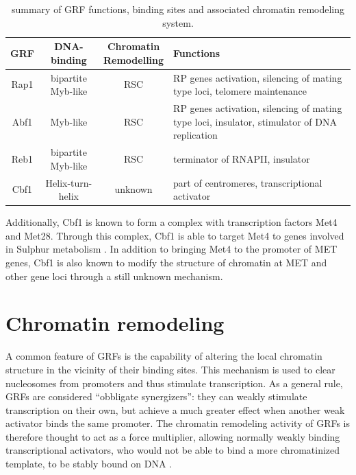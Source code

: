 \begin{table}
\begin{tabular}[c]{cccp{4.9cm}}
\hline 
GRF & DNA-binding & \makecell{Chromatin\\Remodelling}  & Functions  \\
\hline 
Rap1 & bipartite Myb-like & RSC & RP genes activation, silencing of mating type loci, telomere maintenance \vspace{2mm} \\ 
Abf1 & Myb-like & RSC & RP genes activation, silencing of mating type loci, insulator, stimulator of DNA replication \vspace{2mm} \\
Reb1 & bipartite Myb-like & RSC & terminator of RNAPII, insulator \vspace{2mm} \\ 
Cbf1 & Helix-turn-helix & unknown & part of centromeres, transcriptional activator \\ 
\hline 

\end{tabular} 
\caption[characteristics of GRFs]{summary of GRF functions, binding sites and associated chromatin remodeling system.}
\label{tab:grfs}
\end{table}

Additionally, Cbf1 is known to form a complex with transcription factors Met4 and Met28. 
Through this complex, Cbf1 is able to target Met4 to genes involved in Sulphur metabolism \cite{oconnell:1995:role}. 
In addition to bringing Met4 to the promoter of MET genes, Cbf1 is also known to modify the structure of chromatin at MET and other gene loci through a still unknown mechanism.


\section{Chromatin remodeling} 

A common feature of GRFs is the capability of altering the local chromatin structure in the vicinity of their binding sites. This mechanism is used to clear nucleosomes from promoters and thus stimulate transcription. 
As a general rule, GRFs are considered “obbligate synergizers”: they can weakly stimulate transcription on their own, but achieve a much greater effect when another weak activator binds the same promoter. 
The chromatin remodeling activity of GRFs is therefore thought to act as a force multiplier, allowing normally weakly binding transcriptional activators, who would not be able to bind a more chromatinized template, to be stably bound on DNA \cite{chasman:1990:yeast,bussemaker:2001:regulatory,pilpel:2001:identifying}.


